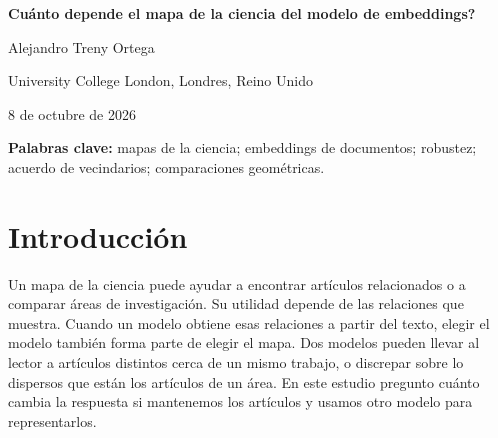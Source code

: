 \documentclass[12pt]{article}
\begin{document}
\begin{center}
{\LARGE\bfseries \textquestiondown{}Cuánto depende el mapa de la ciencia del modelo de embeddings?\par}
\vspace{12pt}
{\large Alejandro Treny Ortega\par}
\smallskip
University College London, Londres, Reino Unido\par
\medskip
{\small 8 de octubre de 2026\par}
\end{center}

\begin{abstract}
Los mapas de la ciencia describen relaciones entre artículos. Los modelos de embeddings de texto construyen esas relaciones al convertir el texto de un artículo en una lista de números que le da una posición. \textquestiondown{}Otro modelo daría la misma imagen? Comparo diez modelos con los títulos y resúmenes de 500.000 publicaciones de 2000--2024 del catálogo bibliográfico OpenAlex, repartidas en 26 disciplinas, como Medicina o Física. Representar cada disciplina mediante la posición media de sus artículos produce una organización parecida entre modelos, también al elegir otros artículos. Sin embargo, dentro de una disciplina y período, dos modelos comparten, en promedio, solo ocho de los 25 artículos más cercanos a un mismo trabajo. Darles solo los títulos también cambia buena parte de esa lista, con efectos que varían entre modelos. Los modelos también pueden discrepar sobre qué disciplina tiene sus artículos más dispersos. Una de las medidas de dispersión compara los ángulos entre líneas trazadas desde un mismo punto hasta la posición de cada artículo. Cambiar ese punto puede invertir qué disciplina parece más dispersa, aunque el resultado se mantenga al elegir otros artículos. La organización general puede mantenerse mientras las respuestas sobre artículos cercanos y diferencias entre disciplinas dependen del modelo, del texto que recibe y de cómo se procesa su salida.
\end{abstract}
\textbf{Palabras clave:} mapas de la ciencia; embeddings de documentos; robustez; acuerdo de vecindarios; comparaciones geométricas.

\section{Introducción}
Un mapa de la ciencia puede ayudar a encontrar artículos relacionados o a comparar áreas de investigación. Su utilidad depende de las relaciones que muestra. Cuando un modelo obtiene esas relaciones a partir del texto, elegir el modelo también forma parte de elegir el mapa. Dos modelos pueden llevar al lector a artículos distintos cerca de un mismo trabajo, o discrepar sobre lo dispersos que están los artículos de un área. En este estudio pregunto cuánto cambia la respuesta si mantenemos los artículos y usamos otro modelo para representarlos.
\end{document}
